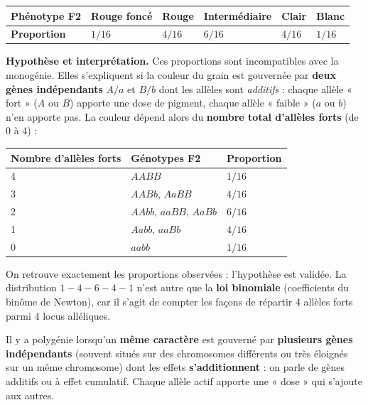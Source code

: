 \documentclass[11pt]{article}
\newcommand{\cle}[1]{{\popxbold\color{popdark}#1}}
\begin{document}
\begin{center}
\begin{tabularx}{\linewidth}{|l|X|X|X|X|X|}
\hline
\rowcolor{popblueL} \textbf{Phénotype F2} & Rouge foncé & Rouge & Intermédiaire & Clair & Blanc \\
\hline
\textbf{Proportion} & $1/16$ & $4/16$ & $6/16$ & $4/16$ & $1/16$ \\
\hline
\end{tabularx}
\end{center}

\textbf{Hypothèse et interprétation.} Ces proportions sont incompatibles avec la monogénie. Elles s'expliquent si la couleur du grain est gouvernée par \textbf{deux gènes indépendants} $A/a$ et $B/b$ dont les allèles sont \emph{additifs} : chaque allèle « fort » ($A$ ou $B$) apporte une dose de pigment, chaque allèle « faible » ($a$ ou $b$) n'en apporte pas. La couleur dépend alors du \textbf{nombre total d'allèles forts} (de 0 à 4) :

\begin{center}
\begin{tabularx}{\linewidth}{|l|X|X|}
\hline
\rowcolor{popblueL} \textbf{Nombre d'allèles forts} & \textbf{Génotypes F2} & \textbf{Proportion} \\
\hline
4 & $AABB$ & $1/16$ \\
\hline
3 & $AABb$, $AaBB$ & $4/16$ \\
\hline
2 & $AAbb$, $aaBB$, $AaBb$ & $6/16$ \\
\hline
1 & $Aabb$, $aaBb$ & $4/16$ \\
\hline
0 & $aabb$ & $1/16$ \\
\hline
\end{tabularx}
\end{center}

On retrouve exactement les proportions observées : l'hypothèse est validée. La distribution $1-4-6-4-1$ n'est autre que la \textbf{loi binomiale} (coefficients du binôme de Newton), car il s'agit de compter les façons de répartir 4 allèles forts parmi 4 locus alléliques.

\begin{definition}[Polygénie]
Il y a \cle{polygénie} lorsqu'un \textbf{même caractère} est gouverné par \textbf{plusieurs gènes indépendants} (souvent situés sur des chromosomes différents ou très éloignés sur un même chromosome) dont les effets \textbf{s'additionnent} : on parle de \cle{gènes additifs} ou à effet cumulatif. Chaque allèle actif apporte une « dose » qui s'ajoute aux autres.
\end{definition}
\end{document}
